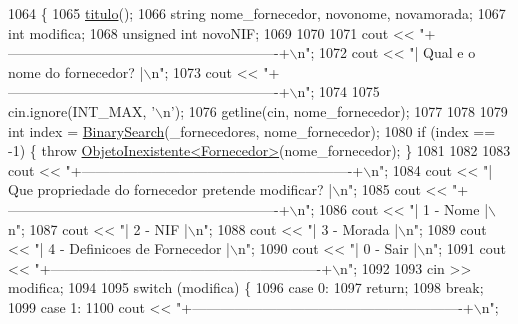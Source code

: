 \begin{DoxyCode}
1064 \{
1065     \hyperlink{classEmpresa_ad79f7196a8ce7256771cbd7b9542155c}{titulo}();
1066     \textcolor{keywordtype}{string} nome\_fornecedor, novonome, novamorada;
1067     \textcolor{keywordtype}{int} modifica;
1068     \textcolor{keywordtype}{unsigned} \textcolor{keywordtype}{int} novoNIF;
1069 
1070 
1071     cout << \textcolor{stringliteral}{"+----------------------------------------------------------+\(\backslash\)n"};
1072     cout << \textcolor{stringliteral}{"| Qual e o nome do fornecedor?                             |\(\backslash\)n"};
1073     cout << \textcolor{stringliteral}{"+----------------------------------------------------------+\(\backslash\)n"};
1074 
1075     cin.ignore(INT\_MAX, \textcolor{charliteral}{'\(\backslash\)n'});
1076     getline(cin, nome\_fornecedor);
1077 
1078 
1079     \textcolor{keywordtype}{int} index = \hyperlink{extras_8h_abc85c93edf561168b5bbee8054caa388}{BinarySearch}(\_fornecedores, nome\_fornecedor);
1080     \textcolor{keywordflow}{if} (index == -1) \{ \textcolor{keywordflow}{throw} \hyperlink{classObjetoInexistente}{ObjetoInexistente<Fornecedor>}(nome\_fornecedor); \}
1081 
1082 
1083     cout << \textcolor{stringliteral}{"+----------------------------------------------------------+\(\backslash\)n"};
1084     cout << \textcolor{stringliteral}{"| Que propriedade do fornecedor pretende modificar?        |\(\backslash\)n"};
1085     cout << \textcolor{stringliteral}{"+----------------------------------------------------------+\(\backslash\)n"};
1086     cout << \textcolor{stringliteral}{"| 1 - Nome                                                 |\(\backslash\)n"};
1087     cout << \textcolor{stringliteral}{"| 2 - NIF                                                  |\(\backslash\)n"};
1088     cout << \textcolor{stringliteral}{"| 3 - Morada                                               |\(\backslash\)n"};
1089     cout << \textcolor{stringliteral}{"| 4 - Definicoes de Fornecedor                             |\(\backslash\)n"};
1090     cout << \textcolor{stringliteral}{"| 0 - Sair                                                 |\(\backslash\)n"};
1091     cout << \textcolor{stringliteral}{"+----------------------------------------------------------+\(\backslash\)n"};
1092 
1093     cin >> modifica;
1094 
1095     \textcolor{keywordflow}{switch} (modifica) \{
1096     \textcolor{keywordflow}{case} 0:
1097         \textcolor{keywordflow}{return};
1098         \textcolor{keywordflow}{break};
1099     \textcolor{keywordflow}{case} 1:
1100         cout << \textcolor{stringliteral}{"+----------------------------------------------------------+\(\backslash\)n"};

\end{DoxyCode}
